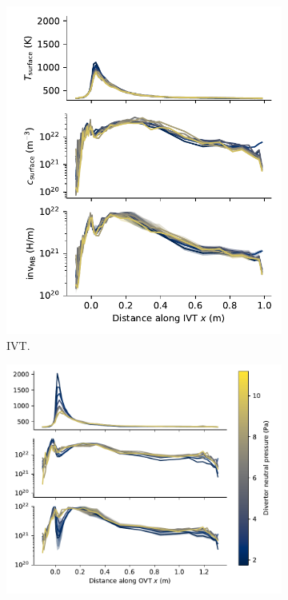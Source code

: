 \begin{figure}[h!]
    \captionsetup[subfigure]{format=plain,singlelinecheck=true}  %
    \centering
    \begin{subfigure}{0.42\linewidth}
        \includegraphics[width=\linewidth]{Figures/Chapter4/ITER/inventory_along_inner_divertor.pdf}
        \caption{IVT.}
    \end{subfigure}%
    \begin{subfigure}{0.58\linewidth}
        \includegraphics[width=\linewidth]{Figures/Chapter4/ITER/inventory_along_outer_divertor.pdf}

\end{subfigure}
\end{figure}
